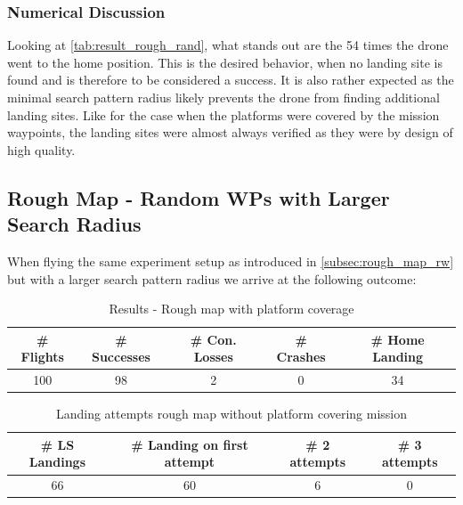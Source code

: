     \subsubsection{Numerical Discussion}

    Looking at \cref{tab:result_rough_rand}, what stands out are the 54 times the drone went to the home position. This is the desired behavior, when no landing site is found and is therefore to be considered a success. It is also rather expected as the minimal search pattern radius likely prevents the drone from finding additional landing sites. Like for the case when the platforms were covered by the mission waypoints, the landing sites were almost always verified as they were by design of high quality. 
    

\subsection{Rough Map - Random WPs with Larger Search Radius}

    When flying the same experiment setup as introduced in \cref{subsec:rough_map_rw} but with a larger search pattern radius we arrive at the following outcome:

    \begin{table}[h]
        \begin{center}
         \caption{Results - Rough map with platform coverage}\vspace{1ex}
         \label{tab:result_rough_rand_lr}
         \begin{tabular}{|c|c|c|c|c|}
         \hline
         \# Flights & \# Successes & \# Con. Losses & \# Crashes & \# Home Landing\\ \hline \hline
         100 & 98 & 2 & 0 & 34 \\
         \hline
         \end{tabular}
        \end{center}
    \end{table}

    \begin{table}[h]
        \begin{center}
         \caption{Landing attempts rough map without platform covering mission}\vspace{1ex}
         \label{tab:land_nums_rough_rand_lr}
         \begin{tabular}{|c|c|c|c|}
         \hline
         \# LS Landings & \# Landing on first attempt & \# 2 attempts & \# 3 attempts\\ \hline \hline
         66 & 60 & 6 & 0 \\
         \hline
         \end{tabular}
        \end{center}
    \end{table}

